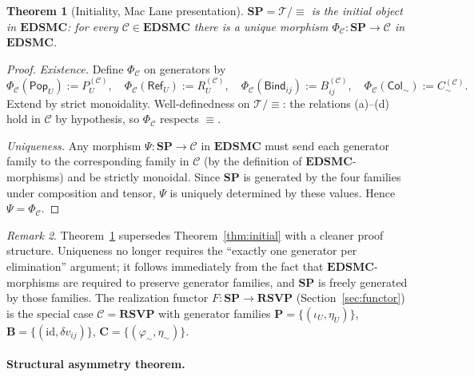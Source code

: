 \documentclass[12pt,a4paper]{article}
\newtheorem{theorem}{Theorem}[section]
\theoremstyle{definition}
\theoremstyle{remark}
\newtheorem{remark}[theorem]{Remark}
\newcommand{\SP}{\mathbf{SP}}
\newcommand{\RSVP}{\mathbf{RSVP}}
\newcommand{\EDSMC}{\mathbf{EDSMC}}
\providecommand{\id}{\mathrm{id}}
\renewcommand{\id}{\mathrm{id}}
\begin{document}
\begin{theorem}[Initiality, Mac Lane presentation]
\label{thm:initial-maclane}
$\SP=\mathcal{T}/{\equiv}$ is the initial object in $\EDSMC$: for every
$\mathcal{C}\in\EDSMC$ there is a unique morphism $\Phi_\mathcal{C}:\SP\to\mathcal{C}$
in $\EDSMC$.
\end{theorem}

\begin{proof}
\emph{Existence.} Define $\Phi_\mathcal{C}$ on generators by
\[
  \Phi_\mathcal{C}(\mathsf{Pop}_U):=P^{(\mathcal{C})}_U,\quad
  \Phi_\mathcal{C}(\mathsf{Ref}_U):=R^{(\mathcal{C})}_U,\quad
  \Phi_\mathcal{C}(\mathsf{Bind}_{ij}):=B^{(\mathcal{C})}_{ij},\quad
  \Phi_\mathcal{C}(\mathsf{Col}_\sim):=C^{(\mathcal{C})}_\sim.
\]
Extend by strict monoidality. Well-definedness on $\mathcal{T}/{\equiv}$: the
relations (a)--(d) hold in $\mathcal{C}$ by hypothesis, so $\Phi_\mathcal{C}$
respects $\equiv$.

\emph{Uniqueness.} Any morphism $\Psi:\SP\to\mathcal{C}$ in $\EDSMC$ must send
each generator family to the corresponding family in $\mathcal{C}$ (by the
definition of $\EDSMC$-morphisms) and be strictly monoidal. Since $\SP$ is
generated by the four families under composition and tensor, $\Psi$ is uniquely
determined by these values. Hence $\Psi=\Phi_\mathcal{C}$.
\end{proof}

\begin{remark}
Theorem~\ref{thm:initial-maclane} supersedes Theorem~\ref{thm:initial} with a
cleaner proof structure. Uniqueness no longer requires the ``exactly one generator
per elimination'' argument; it follows immediately from the fact that
$\EDSMC$-morphisms are required to preserve generator families, and $\SP$ is freely
generated by those families. The realization functor $F:\SP\to\RSVP$
(Section~\ref{sec:functor}) is the special case $\mathcal{C}=\RSVP$ with
generator families $\mathbf{P}=\{(\iota_U,\eta_U)\}$, $\mathbf{B}=\{(\id,\delta v_{ij})\}$,
$\mathbf{C}=\{(\varphi_\sim,\eta_\sim)\}$.
\end{remark}

\paragraph{Structural asymmetry theorem.}
\end{document}
